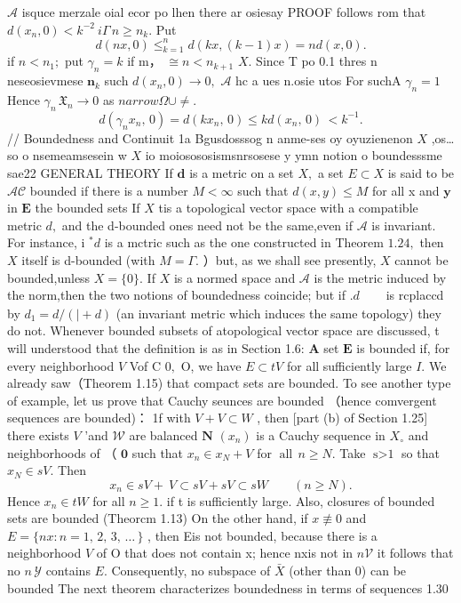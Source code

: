$\textstyle{\mathcal{A}}$ isquce merzale oial ecor po lhen there ar osiesay PROOF follows rom that $d(x_{n},0)<k^{-2}\ i\Gamma\,n\geq n_{k}.$ Put $$ d(n x,0)\leq_{k=1}^{n}d(k x,(k-1)x)=n d(x,0). $$ if $n<n_{1};$ put $\gamma_{n}=k$ if m， $\cong n<n_{k+1}$ $X.$ Since T po 0.1 thres n neseosievmese ${\boldsymbol{n}}_{k}$ such $d(x_{n},0)\to0,$ $\mathcal{A}$ hc a ues n.osie utos For suchA $\gamma_{n}=1$ Hence $\gamma_{n}\,{\mathfrak{X}}_{n}\to0$ as $n arrow\Omega\cup\neq.$ $$ d(\gamma_{n}x_{n},\,0)=d(k x_{n},\,0)\le k d(x_{n},\,0)\,<k^{-1}. $$ // Boundedness and Continuit 1a Bgusdosssog n anme-ses oy oyuzienenon $X$ ,os…so o nsemeamsesein w $\textstyle{X}$ io moiosososismsnrsosese y ymn notion o boundesssme sae22 GENERAL THEORY If ${\boldsymbol{d}}$ is a metric on a set $X,$ a set $E\subset X$ is said to be ${\mathcal{A}}{\mathcal{C}}$ bounded if there is a number $M<\infty$ such that $d(x,y)\leq M$ for all x and $\mathbf{y}$ in $\boldsymbol{E}$ the bounded sets If $\textstyle X$ tis a topological vector space with a compatible metric $d,$ and the d-bounded ones need not be the same,even if ${\mathcal{A}}$ is invariant. For instance, i $^{*}d$ is a mctric such as the one constructed in Theorem $1.24,$ then $X$ itself is d-bounded (with $M=\Gamma.$ ）but, as we shall see presently, $\textstyle X$ cannot be bounded,unless $X=\{0\}.$ If $\textstyle X$ is a normed space and ${\mathcal{A}}$ is the metric induced by the norm,then the two notions of boundedness coincide; but if $ .d\!\begin{array}{l}{\quad{}}\\ {\quad}\\ {\quad}\end{array}$ is rcplaccd by $d_{1}=d/(\mid+d)$ (an invariant metric which induces the same topology) they do not. Whenever bounded subsets of atopological vector space are discussed, t will understood that the definition is as in Section 1.6: $\mathbf{A}$ set $\boldsymbol{E}$ is bounded if, for every neighborhood ${\mathbf{}}V$ Vof C $0,$ O, we have $E\subset t V$ for all sufficiently large ${\mathit{I}}.$ We already saw（Theorem 1.15) that compact sets are bounded. To see another type of example, let us prove that Cauchy seunces are bounded （hence comvergent sequences are bounded)： 1f with $V+V\subset W$ , then [part (b) of Section 1.25] there exists ${\mathbf{}}V$ ’and ${\mathcal{W}}$ are balanced $\boldsymbol{N}$ $\scriptstyle(x_{n})$ is a Cauchy sequence in $X_{\circ}$ and neighborhoods of （ $\mathbf{0}$ such that $x_{n}\in x_{N}+V$ for ${\operatorname{all}}\,n\geq N.$ Take $\operatorname{s>1}$ so that $x_{N}\in s V.$ Then $$ x_{n}\in s V+\ V\subset s V+s V\subset s W\quad\quad(n\geq N). $$ Hence $x_{n}\in t W$ for all $\scriptstyle n\geq1.$ if t is sufficiently large. Also, closures of bounded sets are bounded (Theorcm 1.13) On the other hand, if $x\not\equiv0$ and $E=\{n x\colon n=1,\,2,\,3,\,\ldots\,\}$ , then Eis not bounded, because there is a neighborhood ${\mathbf{}}V$ of O that does not contain x; hence nxis not in $n{\mathcal{V}}$ it follows that no $n\,{\mathcal{Y}}$ contains $\textstyle E.$ Consequently, no subspace of $\textstyle{\bar{X}}$ (other than {0}) can be bounded The next theorem characterizes boundedness in terms of sequences 1.30 